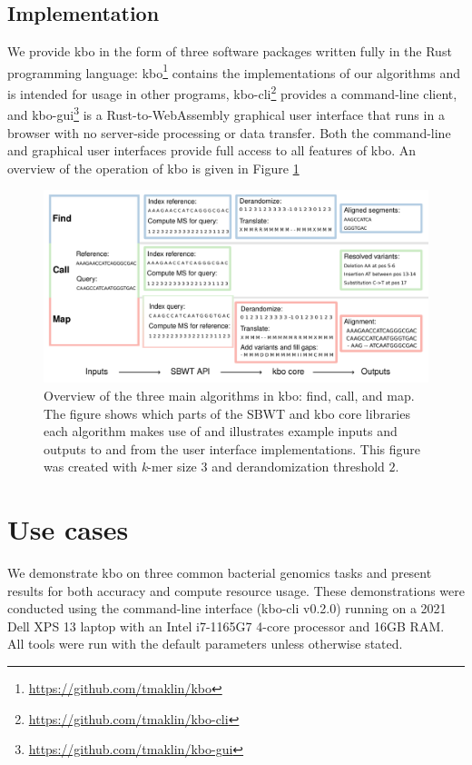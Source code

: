 \documentclass[unnumsec,webpdf,contemporary,large]{oup-authoring-template}%
\theoremstyle{thmstyleone}%
\theoremstyle{thmstyletwo}%
\theoremstyle{thmstylethree}%
\begin{document}
\subsection{Implementation}
We provide {\sf kbo} in the form of three software packages written fully in the Rust programming language: kbo\footnote{\url{https://github.com/tmaklin/kbo}} contains the implementations of our algorithms and is intended for usage in other programs, kbo-cli\footnote{\url{https://github.com/tmaklin/kbo-cli}} provides a command-line client, and kbo-gui\footnote{\url{https://github.com/tmaklin/kbo-gui}} is a Rust-to-WebAssembly graphical user interface that runs in a browser with no server-side processing or data transfer. Both the command-line and graphical user interfaces provide full access to all features of {\sf kbo}. An overview of the operation of {\sf kbo} is given in Figure \ref{fig:kbo-overview}

\begin{figure}[!t]%
\centering
\includegraphics{fig/kbo_overview.pdf}
\caption{Overview of the three main algorithms in {\sf kbo}: find, call, and map. The figure shows which parts of the SBWT and {\sf kbo} core libraries each algorithm makes use of and illustrates example inputs and outputs to and from the user interface implementations. This figure was created with \emph{k}-mer size $3$ and derandomization threshold $2$.}\label{fig:kbo-overview}
\end{figure}


\section{Use cases}
We demonstrate {\sf kbo} on three common bacterial genomics tasks and present results for both accuracy and compute resource usage. These demonstrations were conducted using the command-line interface (kbo-cli v0.2.0) running on a 2021 Dell XPS 13 laptop with an Intel i7-1165G7 4-core processor and 16GB RAM. All tools were run with the default parameters unless otherwise stated.
\end{document}
